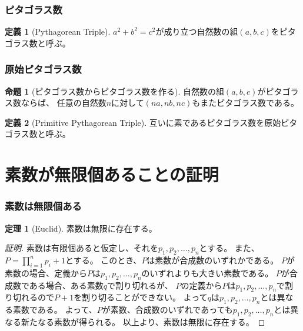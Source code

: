 \documentclass[dvipdfmx,11pt,notheorems]{beamer}
\theoremstyle{definition}
\newtheorem{theorem}{定理}
\newtheorem{definition}{定義}
\newtheorem{proposition}{命題}
\begin{document}
\begin{frame}\frametitle{ピタゴラス数}

\begin{definition}[Pythagorean Triple]
$a^{2} + b^{2} = c^{2}$が成り立つ自然数の組$(a, b, c)$をピタゴラス数と呼ぶ。
\end{definition}

\end{frame}

\begin{frame}\frametitle{原始ピタゴラス数}

\begin{proposition}[ピタゴラス数からピタゴラス数を作る]
自然数の組$(a, b, c)$がピタゴラス数ならば、
任意の自然数$n$に対して$(na, nb, nc)$もまたピタゴラス数である。
\end{proposition}

\begin{definition}[Primitive Pythagorean Triple]
互いに素であるピタゴラス数を原始ピタゴラス数と呼ぶ。
\end{definition}

\end{frame}

\section{素数が無限個あることの証明}

\begin{frame}\frametitle{素数は無限個ある}

\begin{theorem}[Euclid]
素数は無限に存在する。
\end{theorem}

\begin{proof}[証明]

素数は有限個あると仮定し、それを$p_{1}, p_{2}, \dots,  p_{n}$とする。
また、$P = \displaystyle \prod^{n}_{i=1}p_{i} + 1$とする。
このとき、$P$は素数が合成数のいずれかである。
$P$が素数の場合、定義から$P$は$p_{1}, p_{2}, \dots,  p_{n}$のいずれよりも大きい素数である。
$P$が合成数である場合、ある素数$q$で割り切れるが、
$P$の定義から$P$は$p_{1}, p_{2}, \dots,  p_{n}$で割り切れるので$P+1$を割り切ることができない。
よって$q$は$p_{1}, p_{2}, \dots,  p_{n}$とは異なる素数である。
よって、$P$が素数、合成数のいずれであっても$p_{1}, p_{2}, \dots,  p_{n}$とは異なる新たなる素数が得られる。
以上より、素数は無限に存在する。
\end{proof}

\end{frame}
\end{document}
